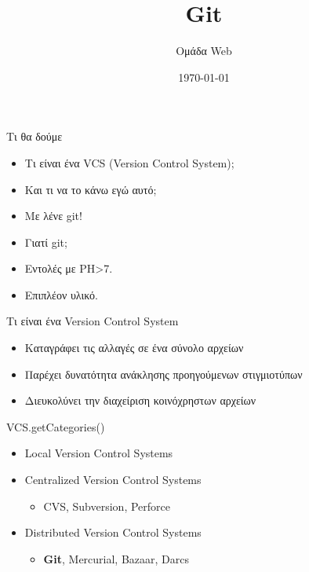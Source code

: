 \documentclass{beamer}
\title{Git}
\author{
Ομάδα Web}
\date{\today}
\begin{document}
\begin{frame}
\begin{minipage}{\hsize}
\centering
\end{minipage}
\titlepage
\end{frame} 

\begin{frame}{Τι θα δούμε}
  \begin{itemize}
   \item Τι είναι ένα VCS (Version Control System);
   \pause
   \item Και τι να το κάνω εγώ αυτό;
   \pause
   \item Με λένε git!
   \pause
   \item Γιατί git;
   \pause
   \item Εντολές με PH>7.
   \pause
   \item Επιπλέον υλικό.
  \end{itemize}
\end{frame}

\begin{frame}{Τι είναι ένα Version Control System}
  \begin{itemize}
    \item Καταγράφει τις αλλαγές σε ένα σύνολο αρχείων
    \item Παρέχει δυνατότητα ανάκλησης προηγούμενων στιγμιοτύπων
    \item Διευκολύνει την διαχείριση κοινόχρηστων αρχείων
  \end{itemize}
\end{frame}

\begin{frame}{VCS.getCategories()}
  \begin{itemize}
    \item Local Version Control Systems
    \item Centralized Version Control Systems
    \begin{itemize}
      \item CVS, Subversion, Perforce
    \end{itemize}
    \item Distributed Version Control Systems
    \begin{itemize}
      \item \textbf{Git}, Mercurial, Bazaar, Darcs
    \end{itemize}
  \end{itemize}
\end{frame}
\end{document}
